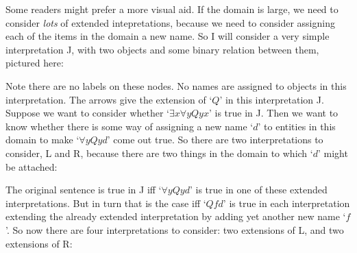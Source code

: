 Some readers might prefer a more visual aid. If the domain is large, we need to consider \emph{lots} of extended intepretations, because we need to consider assigning each of the items in the domain a new name. So I will consider a very simple interpretation J, with two objects and some binary relation between them, pictured here: 
\begin{center}
\end{center}
Note there are no labels on these nodes. No names are assigned to objects in this interpretation. The arrows give the extension of `$Q$' in this interpretation J. Suppose we want to consider whether `$\exists x \forall y Qyx$' is true in J. Then we want to know whether there is some way of assigning a new name `$d$' to entities in this domain to make `$\forall y Qyd$' come out true. So there are two interpretations to consider, L and R, because there are two things in the domain to which `$d$' might be attached: 
\begin{center}
	  \qquad {}
\end{center} 
The original sentence is true in J iff `$\forall y Qyd$' is true in one of these extended interpretations. But in turn that is the case iff `$Qfd$' is true in each interpretation extending the already extended interpretation by adding yet another new name `$f$'. So now there are four interpretations to consider: two extensions of L, and two extensions of R:
